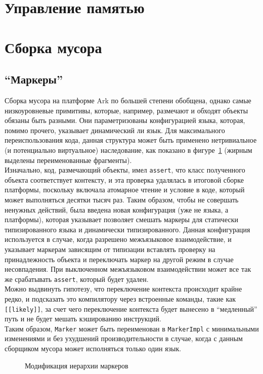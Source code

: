 \documentclass[times,specification,annotation]{itmo-student-thesis}
\begin{document}
\section{Управление памятью}

\section{Сборка мусора}
\subsection{``Маркеры''}
Сборка мусора на платформе Ark по большей степени обобщена, однако самые низкоуровневые примитивы, которые, например, размечают и обходят объекты обязаны быть разными. Они параметризованы конфигурацией языка, которая, помимо прочего, указывает динамический ли язык. Для максимального переиспользования кода, данная структура может быть применено нетривиальное (и потенциально виртуальное) наследование, как показано в фигуре~\ref{fig:gc-markers} (жирным выделены переименованные фрагменты).\\
Изначально, код, размечающий объекты, имел \texttt{assert}, что класс полученного объекта соответствует контексту, и эта проверка удалялась в итоговой сборке платформы, поскольку включала атомарное чтение и условие в коде, который может выполняться десятки тысяч раз. Таким образом, чтобы не совершать ненужных действий, была введена новая конфигурация (уже не языка, а платформы), которая указывает позволяет смешать маркеры для статически типизированного языка и динамически типизированного. Данная конфигурация используется в случае, когда разрешено межъязыковое взаимодействие, и указывает маркерам зависящим от типизации вставлять проверку на принадлежность объекта и переключать маркер на другой режим в случае несовпадения. При выключенном межъязыковом взаимодействии может все так же срабатывать \texttt{assert}, который будет удален.\\
Можно выдвинуть гипотезу, что переключение контекста происходит крайне редко, и подсказать это компилятору через встроенные команды, такие как \texttt{[[likely]]}, за счет чего переключение контекста будет вынесено в ``медленный'' путь и не будет мешать кэшированию инструкций.\\
Таким образом, \texttt{Marker} может быть переименован в \texttt{MarkerImpl} с минимальными изменениями и без ухудшений производительности в случае, когда с данным сборщиком мусора может исполняться только один язык.
\begin{figure}[!h]
\caption{Модификация иерархии маркеров}\label{fig:gc-markers}
\centering
\end{figure}
\end{document}
